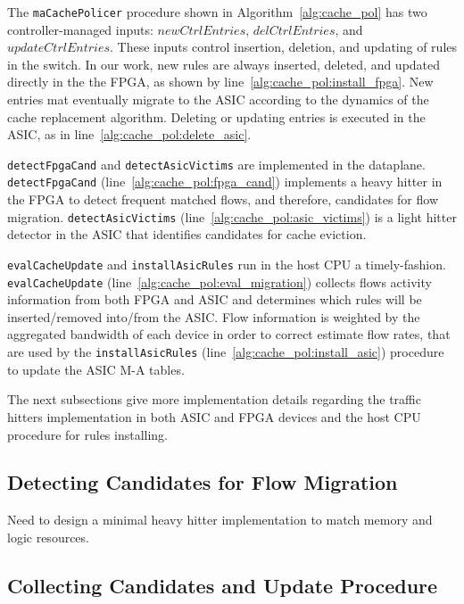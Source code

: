 The \texttt{maCachePolicer} procedure shown in Algorithm~\ref{alg:cache_pol} has two controller-managed inputs: $newCtrlEntries$, $delCtrlEntries$, and $updateCtrlEntries$. These inputs control insertion, deletion, and updating of rules in the switch. In our work, new rules are always inserted, deleted, and updated directly in the the FPGA, as shown by line~\ref{alg:cache_pol:install_fpga}. New entries mat eventually migrate to the ASIC according to the dynamics of the cache replacement algorithm. Deleting or updating entries is executed in the ASIC, as in line~\ref{alg:cache_pol:delete_asic}.


\texttt{detectFpgaCand} and \texttt{detectAsicVictims} are implemented in the dataplane. \texttt{detectFpgaCand} (line~\ref{alg:cache_pol:fpga_cand}) implements a heavy hitter in the FPGA to detect frequent matched flows, and therefore, candidates for flow migration. \texttt{detectAsicVictims} (line~\ref{alg:cache_pol:asic_victims}) is a light hitter detector in the ASIC that identifies candidates for cache eviction.

\texttt{evalCacheUpdate} and \texttt{installAsicRules} run in the host CPU a timely-fashion. \texttt{evalCacheUpdate} (line~\ref{alg:cache_pol:eval_migration}) collects flows activity information from both FPGA and ASIC and determines which rules will be inserted/removed into/from the ASIC. Flow information is weighted by the aggregated bandwidth of each device in order to correct estimate flow rates, that are used by the \texttt{installAsicRules} (line~\ref{alg:cache_pol:install_asic}) procedure to update the ASIC M-A tables.

The next subsections give more implementation details regarding the traffic hitters implementation in both ASIC and FPGA devices and the host CPU procedure for rules installing. 

\subsection{Detecting Candidates for Flow Migration}\label{sec:method:detection}

Need to design a minimal heavy hitter implementation to match memory and logic resources.

\subsection{Collecting Candidates and Update Procedure}\label{sec:method:update}

